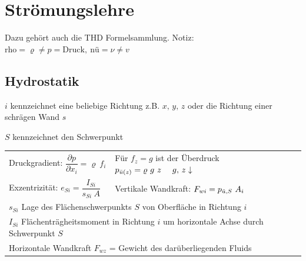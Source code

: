 \setcounter{section}{1} %

\section{Strömungslehre}
	Dazu gehört auch die THD Formelsammlung. Notiz: $ \text{rho} = \varrho \neq p = \text{Druck}, \ \text{nü} = \nu \neq v  $

\subsection{Hydrostatik}
	$ i $ kennzeichnet eine beliebige Richtung z.B. $ x,\, y,\, z $ oder die Richtung einer schrägen Wand $ s $

	$ S $ kennzeichnet den Schwerpunkt

	\begin{center}
		\setlength{\tabcolsep}{1.5em} %
		\begin{tabular}{ll}
			  Druckgradient: $ \dfrac{\partial p}{\partial x_i} =  \varrho\ f_i$
			& Für $ f_z = g $ ist der Überdruck $ p_{\ddot{u}(z)} =  \varrho\ g\ z \quad \ g,\, z \downarrow$
			\\
			  Exzentrizität:       $ e_{Si} = \dfrac{I_{Si}}{s_{Si} \ A}$
			& Vertikale Wandkraft: $ F_{wi} = p_{\ddot{u},S} \ A_i $
			\\
			  \multicolumn{2}{l}{$ s_{Si} $ Lage des Flächenschwerpunkts $ S $ von Oberfläche in Richtung $ i $}
			\\
			  \multicolumn{2}{l}{$ I_{Si} $ Flächenträgheitsmoment in Richtung $ i $ um horizontale Achse durch Schwerpunkt $ S $ }
			\\
			  \multicolumn{2}{l}{Horizontale Wandkraft 	$ F_{wz} $ = Gewicht des darüberliegenden Fluids}
		\end{tabular}
	\end{center}

